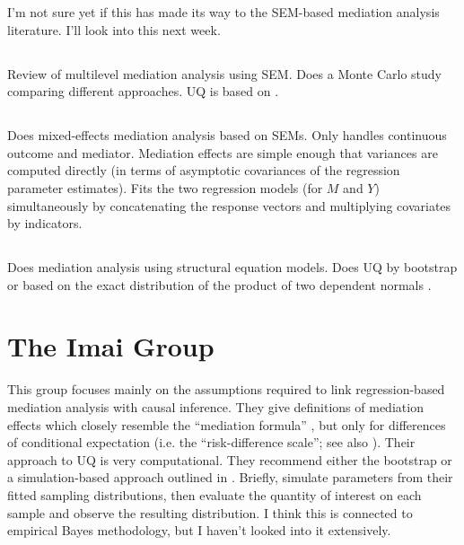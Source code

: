 \documentclass{article}
\begin{document}
I'm not sure yet if this has made its way to the SEM-based mediation analysis literature. I'll look into this next week.

\subsection{\citet{Zig19}}

Review of multilevel mediation analysis using SEM. Does a Monte Carlo study comparing different approaches. UQ is based on \citet{Bau06}.

\subsection{\citet{Bau06}}

Does mixed-effects mediation analysis based on SEMs. Only handles continuous outcome and mediator. Mediation effects are simple enough that variances are computed directly (in terms of asymptotic covariances of the regression parameter estimates). Fits the two regression models (for $M$ and $Y$) simultaneously by concatenating the response vectors and multiplying covariates by indicators.

\subsection{\citet{Pre10}}

Does mediation analysis using structural equation models. Does UQ by bootstrap or based on the exact distribution of the product of two dependent normals \citep{Mac07}.


\section{The Imai Group}
\label{sec:Imai}

This group focuses mainly on the assumptions required to link regression-based mediation analysis with causal inference. They give definitions of mediation effects which closely resemble the ``mediation formula'' \citep{Pea12}, but only for differences of conditional expectation (i.e. the ``risk-difference scale''; see also \citealp{Sam23}). Their approach to UQ is very computational. They recommend either the bootstrap or a simulation-based approach outlined in \citet{Kin00}. Briefly, simulate parameters from their fitted sampling distributions, then evaluate the quantity of interest on each sample and observe the resulting distribution. I think this is connected to empirical Bayes methodology, but I haven't looked into it extensively.
\end{document}
